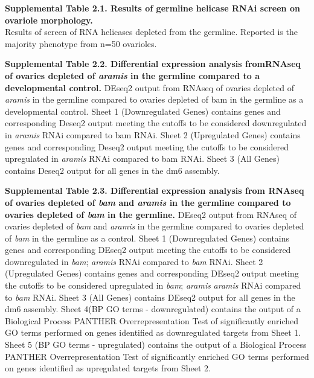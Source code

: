 \documentclass[12pt,oneside]{reedthesis}
\begin{document}
\textbf{Supplemental Table 2.1. Results of germline helicase RNAi screen on ovariole morphology.}\\
Results of screen of RNA helicases depleted from the germline. Reported
is the majority phenotype from n=50 ovarioles.

\textbf{\hfill\break
}

\textbf{Supplemental Table 2.2. Differential expression analysis fromRNAseq of ovaries depleted of \emph{aramis} in the germline compared to a developmental control.}
DEseq2 output from RNAseq of ovaries depleted
of \emph{aramis} in the germline compared to ovaries depleted of bam in the
germline as a developmental control. Sheet 1 (Downregulated Genes)
contains genes and corresponding Deseq2 output meeting the cutoffs to be
considered downregulated in \emph{aramis} RNAi compared to bam RNAi. Sheet 2
(Upregulated Genes) contains genes and corresponding Deseq2 output
meeting the cutoffs to be considered upregulated in \emph{aramis} RNAi
compared to bam RNAi. Sheet 3 (All Genes) contains Deseq2 output for all
genes in the dm6 assembly.

\textbf{Supplemental Table 2.3. Differential expression analysis from RNAseq of ovaries depleted of \emph{bam} and \emph{aramis} in the germline compared to ovaries depleted of \emph{bam} in the germline.}
DEseq2 output from RNAseq of ovaries depleted of \emph{bam} and \emph{aramis} in the germline compared to
ovaries depleted of \emph{bam} in the germline as a control. Sheet 1
(Downregulated Genes) contains genes and corresponding DEseq2 output
meeting the cutoffs to be considered downregulated in \emph{bam}; \emph{aramis}
RNAi compared to \emph{bam} RNAi. Sheet 2 (Upregulated Genes) contains genes
and corresponding DEseq2 output meeting the cutoffs to be considered
upregulated in \emph{bam}; \emph{aramis} \emph{aramis} RNAi compared to \emph{bam} RNAi.
Sheet 3 (All Genes) contains DEseq2 output for all genes in the dm6
assembly. Sheet 4(BP GO terms - downregulated) contains the output of a
Biological Process PANTHER Overrepresentation Test of significantly
enriched GO terms performed on genes identified as downregulated targets
from Sheet 1. Sheet 5 (BP GO terms - upregulated) contains the output of
a Biological Process PANTHER Overrepresentation Test of significantly
enriched GO terms performed on genes identified as upregulated targets
from Sheet 2.

\textbf{\hfill\break
}
\end{document}
